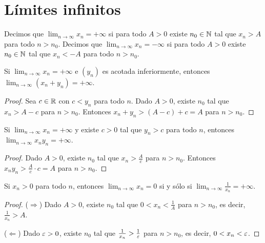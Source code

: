 \section{Límites infinitos}

\begin{definition}
  Decimos que \(\lim_{n \to \infty} x_n = +\infty\) si para todo \(A > 0\) existe \(n_0 \in \mathbb{N}\) tal que \(x_n > A\) para todo \(n > n_0\). Decimos que \(\lim_{n \to \infty} x_n = -\infty\) si para todo \(A > 0\) existe \(n_0 \in \mathbb{N}\) tal que \(x_n < -A\) para todo \(n > n_0\).
\end{definition}

\begin{prop}
  Si \(\lim_{n \to \infty} x_n = +\infty\) e \({(y_n)}\) es acotada inferiormente, entonces \(\lim_{n \to \infty} (x_n + y_n) = +\infty\).
\end{prop}

\begin{proof}
  Sea \(c \in \mathbb{R}\) con \(c < y_n\) para todo \(n\). Dado \(A > 0\), existe \(n_0\) tal que \(x_n > A - c\) para \(n > n_0\). Entonces \(x_n + y_n > (A - c) + c = A\) para \(n > n_0\).
\end{proof}

\begin{prop}
  Si \(\lim_{n \to \infty} x_n = +\infty\) y existe \(c > 0\) tal que \(y_n > c\) para todo \(n\), entonces \(\lim_{n \to \infty} x_n y_n = +\infty\).
\end{prop}

\begin{proof}
  Dado \(A > 0\), existe \(n_0\) tal que \(x_n > \frac{A}{c}\) para \(n > n_0\). Entonces \(x_n y_n > \frac{A}{c} \cdot c = A\) para \(n > n_0\).
\end{proof}

\begin{prop}
  Si \(x_n > 0\) para todo \(n\), entonces \(\lim_{n \to \infty} x_n = 0\) si y sólo si \(\lim_{n \to \infty} \frac{1}{x_n} = +\infty\).
\end{prop}

\begin{proof}
  (\(\Rightarrow\)) Dado \(A > 0\), existe \(n_0\) tal que \(0 < x_n < \frac{1}{A}\) para \(n > n_0\), es decir, \(\frac{1}{x_n} > A\).

  (\(\Leftarrow\)) Dado \(\varepsilon > 0\), existe \(n_0\) tal que \(\frac{1}{x_n} > \frac{1}{\varepsilon}\) para \(n > n_0\), es decir, \(0 < x_n < \varepsilon\).
\end{proof}

